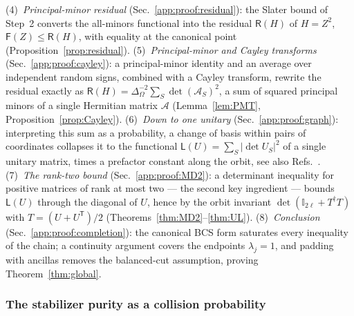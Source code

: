 \documentclass[prx,twocolumn,superscriptaddress,aps,10pt, frontmatterverbose, reprint,footinbib,longbibliography=true]{revtex4-2}
\newcommand{\trans}{\mathsf{T}}
\providecommand{\DIFaddtex}[1]{{\protect\color{red}#1}} %
\providecommand{\DIFaddbegin}{\protect\color{red}} %
\providecommand{\DIFaddend}{\protect\color{black}} %
\providecommand{\DIFaddtex}[1]{\texorpdfstring{\DIFaddtex{#1}}{#1}} %
\providecommand{\DIFadd}[1]{\texorpdfstring{\DIFaddtex{#1}}{#1}} %
\newcommand{\DIFaddincludegraphics}[2][]{{\color{blue}\fbox{\DIFOincludegraphics[#1]{#2}}}} %
\DeclareRobustCommand{\DIFaddbegin}{\DIFOaddbegin \let\includegraphics\DIFaddincludegraphics} %
\DeclareRobustCommand{\DIFaddend}{\DIFOaddend \let\includegraphics\DIFOincludegraphics} %
\begin{document}
(4)~\emph{Principal-minor residual} (Sec.~\ref{app:proof:residual}): the Slater bound of Step~2  converts the all-minors functional into the residual  $\mathsf{R}(H)$ of $H=Z^2$, $\mathsf{F}(Z)\le\mathsf{R}(H)$, with equality at the canonical point (Proposition~\ref{prop:residual}).
(5)~\emph{\DIFaddbegin \DIFadd{Principal-minor and Cayley transforms}\DIFaddend } (Sec.~\ref{app:proof:cayley}): \DIFaddbegin \DIFadd{a principal-minor identity and an average }\DIFaddend over independent random signs, combined with a Cayley transform, rewrite the residual exactly as $\mathsf{R}(H)=\Delta_\Omega^{-2}\sum_S\det(\mathcal{A}_S)^2$, a sum of squared principal minors of a single Hermitian matrix $\mathcal{A}$ (Lemma~\ref{lem:PMT}, Proposition~\ref{prop:Cayley}).
(6)~\emph{Down to one unitary} (Sec.~\ref{app:proof:graph}): interpreting this sum as a probability, a change of basis within pairs of coordinates collapses it to the functional $\mathsf{L}(U)=\sum_S|\det U_S|^2$ of a single unitary matrix, times a prefactor constant along the orbit, see also Refs.~\cite{collura2026nonstabilizernessfermionicgaussianstates,sfeo}.
(7)~\emph{The rank-two bound} (Sec.~\ref{app:proof:MD2}): a determinant inequality for positive matrices of rank at most two --- the second key ingredient --- bounds $\mathsf{L}(U)$ through the diagonal of $U$, hence by the orbit invariant $\det(\mathbb{I}_{2\ell}+T^\dagger T)$ with $T=(U+U^{\trans})/2$ (Theorems~\ref{thm:MD2}--\ref{thm:UL}).
(8)~\emph{Conclusion} (Sec.~\ref{app:proof:completion}): the canonical BCS form saturates every inequality of the chain; a continuity argument covers the endpoints $\lambda_j=1$, and padding with ancillas removes the balanced-cut assumption, proving Theorem~\ref{thm:global}.


\subsubsection{The stabilizer purity as a collision probability}
\label{app:proof:dpp}
\end{document}
